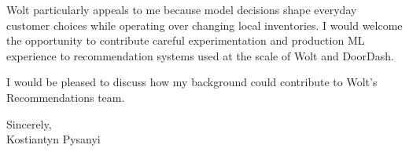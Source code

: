 \documentclass[11pt,a4paper]{article}
\begin{document}
Wolt particularly appeals to me because model decisions shape everyday customer choices while operating over changing local inventories. I would welcome the opportunity to contribute careful experimentation and production ML experience to recommendation systems used at the scale of Wolt and DoorDash.

I would be pleased to discuss how my background could contribute to Wolt's Recommendations team.

Sincerely,\\[0.8em]
Kostiantyn Pysanyi
\end{document}
